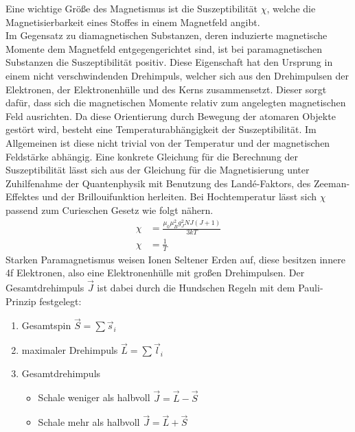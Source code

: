 Eine wichtige Größe des Magnetismus ist die Suszeptibilität $\chi$, welche die Magnetisierbarkeit 
eines Stoffes in einem Magnetfeld angibt.\\ 
Im Gegensatz zu diamagnetischen Substanzen, deren induzierte magnetische Momente dem Magnetfeld 
entgegengerichtet sind, ist bei paramagnetischen Substanzen die Suszeptibilität positiv.
Diese Eigenschaft hat den Ursprung in einem nicht verschwindenden Drehimpuls, welcher sich aus
den Drehimpulsen der Elektronen, der Elektronenhülle und des Kerns zusammensetzt. Dieser sorgt dafür,
dass sich die magnetischen Momente relativ zum angelegten magnetischen Feld ausrichten. Da diese 
Orientierung durch Bewegung der atomaren Objekte gestört wird, besteht eine Temperaturabhängigkeit
der Suszeptibilität. Im Allgemeinen ist diese nicht trivial von der Temperatur und der magnetischen 
Feldstärke abhängig. Eine konkrete Gleichung für die Berechnung der Suszeptibilität lässt sich
aus der Gleichung für die Magnetisierung unter Zuhilfenahme der Quantenphysik mit Benutzung des 
Landé-Faktors, des Zeeman-Effektes und der Brillouifunktion herleiten. Bei Hochtemperatur lässt
sich $\chi$ passend zum Curieschen Gesetz wie folgt nähern.
\begin{align}
\chi&=\frac{\mu_0 \mu_B^2 g_J^2 N J(J+1)}{3 k T} \\
\chi&=\frac{1}{T}
\end{align}
Starken Paramagnetismus weisen Ionen Seltener Erden auf, diese besitzen innere 4f Elektronen, also 
eine Elektronenhülle mit großen Drehimpulsen. Der Gesamtdrehimpuls $\vec J$ ist dabei durch die
Hundschen Regeln mit dem Pauli-Prinzip \cite{anleitung} festgelegt:
	\begin{table}[h]
			\begin{enumerate}
				\item Gesamtspin $\vec S=\sum \vec s_i$ 
				\item maximaler Drehimpuls $\vec L=\sum \vec l_i$ 
				\item Gesamtdrehimpuls 
				\begin{itemize}
					\item Schale weniger als halbvoll $\vec J=\vec L - \vec S$
					\item Schale mehr als halbvoll $\vec J=\vec L + \vec S$
				\end{itemize}
			\end{enumerate}
	\label{hund}
	\end{table}
\FloatBarrier